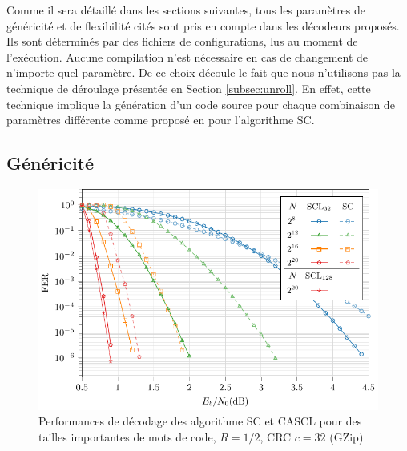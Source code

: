 Comme il sera détaillé dans les sections suivantes, tous les paramètres de généricité et de flexibilité cités sont pris en compte dans les décodeurs proposés. Ils sont déterminés par des fichiers de configurations, lus au moment de l'exécution. Aucune compilation n'est nécessaire en cas de changement de n'importe quel paramètre. De ce choix découle le fait que nous n'utilisons pas la technique de déroulage présentée en Section \ref{subsec:unroll}. En effet, cette technique implique la génération d'un code source pour chaque combinaison de paramètres différente comme proposé en \cite{sarkis_autogenerating_2014} pour l'algorithme SC.

\subsection{Généricité}

\begin{figure}[t]
\includegraphics[width=\textwidth]{main/ch2_fig/curves/code/tikz/code}
\caption{Performances de décodage des algorithme SC et CASCL pour des tailles importantes de mots de code, $R=1/2$, CRC $c=32$ (GZip)}
\label{fig:large_scl}
\end{figure}

